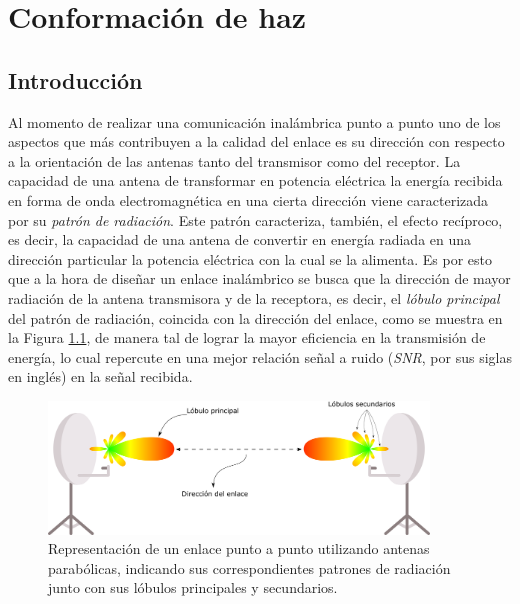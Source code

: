 \chapter{Conformación de haz}\label{ch:beamforming}

\section{Introducción}\label{subc:beamforming_intro}
Al momento de realizar una comunicación inalámbrica punto a punto uno de los aspectos que más contribuyen a la calidad del enlace es su dirección con respecto a la orientación de las antenas tanto del transmisor como del receptor. La capacidad de una antena de transformar en potencia eléctrica la energía recibida en forma de onda electromagnética en una cierta dirección viene caracterizada por su \emph{patrón de radiación}. Este patrón caracteriza, también, el efecto recíproco, es decir, la capacidad de una antena de convertir en energía radiada en una dirección particular la potencia eléctrica con la cual se la alimenta. Es por esto que a la hora de diseñar un enlace inalámbrico se busca que la dirección de mayor radiación de la antena transmisora y de la receptora, es decir, el \emph{lóbulo principal} del patrón de radiación, coincida con la dirección del enlace, como se muestra en la Figura \ref{fig:beamforming_antenasorientadas}, de manera tal de lograr la mayor eficiencia en la transmisión de energía, lo cual repercute en una mejor relación señal a ruido (\emph{SNR}, por sus siglas en inglés) en la señal recibida.

\begin{figure}[ht!]
    \centering
    \includegraphics[width=0.9\textwidth]{images/02-Beamforming/antenasorientadas.png}
    \caption{Representación de un enlace punto a punto utilizando antenas parabólicas, indicando sus correspondientes patrones de radiación junto con sus lóbulos principales y secundarios.}
    \label{fig:beamforming_antenasorientadas}
\end{figure}


